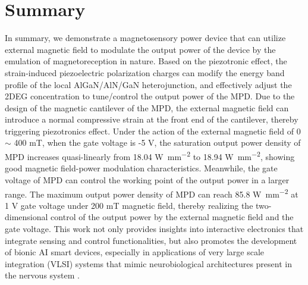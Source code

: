 \section{Summary}
In  summary, we demonstrate a magnetosensory power device that can utilize external magnetic field to modulate the output power of the device by the emulation of magnetoreception in nature. Based on the piezotronic effect, the strain-induced piezoelectric polarization charges can modify the energy band profile of the local AlGaN/AlN/GaN heterojunction, and effectively adjust the 2DEG concentration to tune/control the output power of the MPD. Due to the design of the magnetic cantilever  of the MPD, the external magnetic field can introduce a normal compressive strain at the front end of the  cantilever, thereby triggering piezotronics effect. Under the action of the external magnetic field of 0 $\sim$ 400 \unit{\milli\tesla}, when the gate voltage is -5 \unit{\V}, the saturation output power density of MPD increases quasi-linearly from 18.04 \unit{\W\per\square\mm} to 18.94 \unit{\W\per\square\mm}, showing good magnetic field-power modulation characteristics. Meanwhile, the gate voltage of MPD can control the working point of the output power in a larger range. The maximum output power density of MPD can reach 85.8 \unit{\W\per\square\mm} at 1 \unit{\V} gate voltage under 200 \unit{\milli\tesla} magnetic field, thereby realizing the two-dimensional control of the output power by the external magnetic field and the gate  voltage. This work not only provides insights into interactive electronics  that integrate sensing and control functionalities, but also promotes the development of bionic AI smart devices, especially in applications of very large scale integration (VLSI) systems that mimic neurobiological architectures present in the nervous  system \cite{mead1990neuromorphic,furber2016large}.


 
 